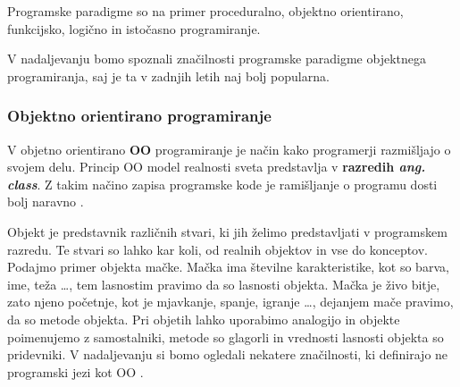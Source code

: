 Programske paradigme so na primer proceduralno, objektno orientirano,
funkcijsko, logično in istočasno programiranje.

V nadaljevanju bomo spoznali značilnosti programske paradigme
objektnega programiranja, saj je ta v zadnjih letih naj bolj
popularna.

\subsubsection{Objektno orientirano programiranje}
\label{sec:objektno_orijentirano_programiranje}


V objetno orientirano \textbf{OO} programiranje je način kako
programerji razmišljajo o svojem delu. Princip OO model realnosti
sveta predstavlja v \textbf{razredih \emph{ang. class}}. Z takim
načino zapisa programske kode je ramišljanje o programu dosti bolj
naravno \cite{shaums}.

Objekt je predstavnik različnih stvari, ki jih želimo predstavljati v
programskem razredu. Te stvari so lahko kar koli, od realnih objektov
in vse do konceptov. Podajmo primer objekta mačke. Mačka ima številne
karakteristike, kot so barva, ime, teža \dots, tem lasnostim pravimo
da so lasnosti objekta. Mačka je živo bitje, zato njeno početnje, kot
je mjavkanje, spanje, igranje \dots, dejanjem mače pravimo, da so
metode objekta. Pri objetih lahko uporabimo analogijo in objekte
poimenujemo z samostalniki, metode so glagorli in vrednosti lasnosti
objekta so pridevniki. V nadaljevanju si bomo ogledali nekatere
značilnosti, ki definirajo ne programski jezi kot OO \cite{OO-JS}.


